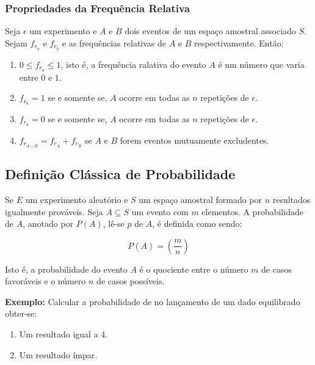  
\subsubsection{Propriedades da Frequência Relativa} 

\inic Seja $\epsilon$ um experimento e $A$ e $B$ dois eventos de um espaço amostral associado $S$. Sejam $f_{r_{a}}$ e $f_{r_{b}}$ e as frequências relativas de $A$ e $B$ respectivamente. Então:

\begin{enumerate}
    \item $0 \leqslant f_{r_{a}}  \leqslant 1$, isto é, a frequência ralativa do evento $A$ é um número que varia entre $0$ e $1$.
    \item $f_{r_{a}}= 1$ se e somente se, $A$ ocorre em todas as $n$ repetições de $\epsilon$.
    \item $f_{r_{a}}= 0$ se e somente se, $A$ ocorre em todas as $n$ repetições de $\epsilon$.
    \item $f_{r_{A \cup B}}  = f_{r_{A}} + f_{r_{B}}$ se $A$ e $B$ forem eventos mutuamente excludentes.
\end{enumerate}
 
 
 
 
 
\subsection{Definição Clássica de Probabilidade}
 
\inic Se $E$ um experimento aleatório e $S$ um espaço amostral formado por $n$ resultados igualmente prováveis. Seja $A \subseteq S$ um evento com $m$ elementos. A probabilidade de $A$, anotado por $P(A)$, lê-se $p$ de $A$, é definida como sendo:
  
\begin{equation}
     P(A)= \left( \frac{m}{n} \right)
\end{equation}
  
\inic Isto é, a probabilidade do evento $A$ é o quociente entre o número $m$ de casos favoráveis e o número $n$ de casos possíveis.\vskip0.3cm


\textbf{Exemplo:} Calcular a probabilidade de no lançamento de um
dado equilibrado obter-se:

\begin{enumerate}
    \item Um resultado igual a 4.
    \item Um resultado ímpar.
\end{enumerate}

